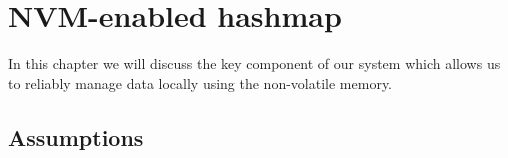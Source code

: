 
\chapter{NVM-enabled hashmap}
In this chapter we will discuss the key component of our system which allows us to reliably manage data locally using the non-volatile memory. 



\section{Assumptions}


